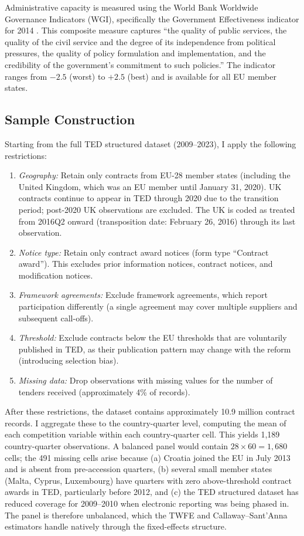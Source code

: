 \documentclass[12pt]{article}
\begin{document}
Administrative capacity is measured using the World Bank Worldwide Governance Indicators (WGI), specifically the Government Effectiveness indicator for 2014 \citep{kaufmann2011}. This composite measure captures ``the quality of public services, the quality of the civil service and the degree of its independence from political pressures, the quality of policy formulation and implementation, and the credibility of the government's commitment to such policies.'' The indicator ranges from $-2.5$ (worst) to $+2.5$ (best) and is available for all EU member states.

\subsection{Sample Construction}

Starting from the full TED structured dataset (2009--2023), I apply the following restrictions:

\begin{enumerate}
\item \textit{Geography:} Retain only contracts from EU-28 member states (including the United Kingdom, which was an EU member until January 31, 2020). UK contracts continue to appear in TED through 2020 due to the transition period; post-2020 UK observations are excluded. The UK is coded as treated from 2016Q2 onward (transposition date: February 26, 2016) through its last observation.
\item \textit{Notice type:} Retain only contract award notices (form type ``Contract award''). This excludes prior information notices, contract notices, and modification notices.
\item \textit{Framework agreements:} Exclude framework agreements, which report participation differently (a single agreement may cover multiple suppliers and subsequent call-offs).
\item \textit{Threshold:} Exclude contracts below the EU thresholds that are voluntarily published in TED, as their publication pattern may change with the reform (introducing selection bias).
\item \textit{Missing data:} Drop observations with missing values for the number of tenders received (approximately 4\% of records).
\end{enumerate}

After these restrictions, the dataset contains approximately 10.9 million contract records. I aggregate these to the country-quarter level, computing the mean of each competition variable within each country-quarter cell. This yields 1,189 country-quarter observations. A balanced panel would contain $28 \times 60 = 1{,}680$ cells; the 491 missing cells arise because (a) Croatia joined the EU in July 2013 and is absent from pre-accession quarters, (b) several small member states (Malta, Cyprus, Luxembourg) have quarters with zero above-threshold contract awards in TED, particularly before 2012, and (c) the TED structured dataset has reduced coverage for 2009--2010 when electronic reporting was being phased in. The panel is therefore unbalanced, which the TWFE and Callaway--Sant'Anna estimators handle natively through the fixed-effects structure.
\end{document}
